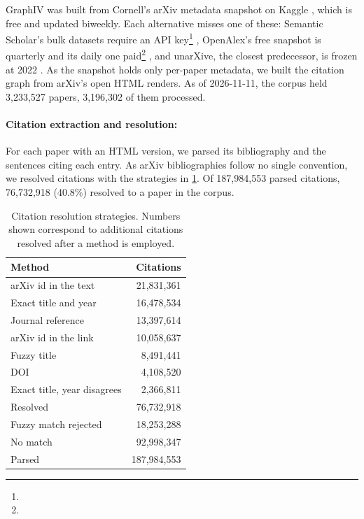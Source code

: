 GraphIV was built from Cornell's arXiv metadata snapshot on Kaggle \citep{clement2019arxiv}, which is free and updated biweekly. Each alternative misses one of these: Semantic Scholar's bulk datasets require an API key\footnote{} \citep{kinney2023s2}, OpenAlex's free snapshot is quarterly and its daily one paid\footnote{} \citep{priem2022openalex}, and unarXive, the closest predecessor, is frozen at 2022 \citep{saier2023unarxive}. As the snapshot holds only per-paper metadata, we built the citation graph from arXiv's open HTML renders. As of 2026-11-11, the corpus held 3,233,527 papers, 3,196,302 of them processed.

\paragraph{Citation extraction and resolution:}
For each paper with an HTML version, we parsed its bibliography and the sentences citing each entry. As arXiv bibliographies follow no single convention, we resolved citations with the strategies in \cref{tab:resolution}. Of 187,984,553 parsed citations, 76,732,918 (40.8\%) resolved to a paper in the corpus.

\begin{table}[t]
\caption{Citation resolution strategies. Numbers shown correspond to additional citations resolved after a method is employed.}
\label{tab:resolution}
\centering
\small
\begin{tabular}{lr}
\toprule
Method & Citations \\
\midrule
arXiv id in the text & 21,831,361 \\
Exact title and year & 16,478,534 \\
Journal reference & 13,397,614 \\
arXiv id in the link & 10,058,637 \\
Fuzzy title & 8,491,441 \\
DOI & 4,108,520 \\
Exact title, year disagrees & 2,366,811 \\
\midrule
Resolved & 76,732,918 \\
Fuzzy match rejected & 18,253,288 \\
No match & 92,998,347 \\
\midrule
Parsed & 187,984,553 \\
\bottomrule
\end{tabular}
\end{table}


